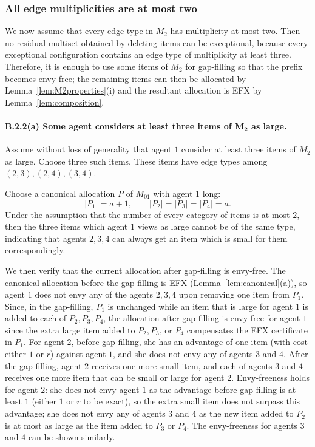 \documentclass{article}
\theoremstyle{definition}
\begin{document}
\subsubsection{All edge multiplicities are at most two}

We now assume that every edge type in $M_2$ has multiplicity at most two.
Then no residual multiset obtained by deleting items can be exceptional,
because every exceptional configuration contains an edge type of multiplicity
at least three.  Therefore, it is enough to use some items of $M_2$ for
gap-filling so that the prefix becomes envy-free; the remaining items can then
be allocated by Lemma~\ref{lem:M2properties}(i) and the resultant allocation is EFX by Lemma~\ref{lem:composition}.

\paragraph{B.2.2(a) Some agent considers at least three items of $\boldsymbol{M_2}$ as large.}
Assume without loss of generality that agent $1$ consider at least three
items of $M_2$ as large.  Choose three such items.  These items have edge types among
$(2,3),(2,4),(3,4)$.

Choose a canonical allocation $P$ of $M_{01}$ with agent $1$ long:
\[
    |P_1|=a+1,\qquad |P_2|=|P_3|=|P_4|=a.
\]
Under the assumption that the number of every category of items is at most $2$, then the three items which agent $1$ views as large cannot be of the same type, indicating that agents $2,3,4$ can always get an item which is small for them correspondingly.

We then verify that the current allocation after gap-filling is envy-free.
The canonical allocation before the gap-filling is EFX (Lemma~\ref{lem:canonical}(a)), so agent $1$ does not envy any of the agents $2,3,4$ upon removing one item from $P_1$.
Since, in the gap-filling, $P_1$ is unchanged while an item that is large for agent $1$ is added to each of $P_2,P_3,P_4$, the allocation after gap-filling is envy-free for agent $1$ since the extra large item added to $P_2,P_3$, or $P_4$ compensates the EFX certificate in $P_1$.
For agent $2$, before gap-filling, she has an advantage of one item (with cost either $1$ or $r$) against agent $1$, and she does not envy any of agents $3$ and $4$.
After the gap-filling, agent $2$ receives one more small item, and each of agents $3$ and $4$ receives one more item that can be small or large for agent $2$.
Envy-freeness holds for agent $2$: she does not envy agent $1$ as the advantage before gap-filling is at least $1$ (either $1$ or $r$ to be exact), so the extra small item does not surpass this advantage; she does not envy any of agents $3$ and $4$ as the new item added to $P_2$ is at most as large as the item added to $P_3$ or $P_4$.
The envy-freeness for agents $3$ and $4$ can be shown similarly.
\end{document}
